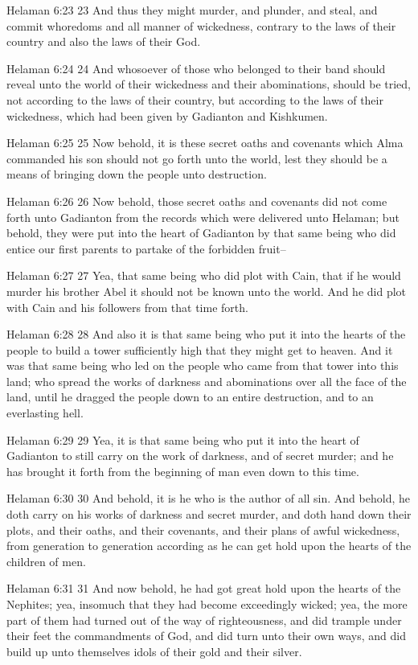 Helaman 6:23
 23 And thus they might murder, and plunder, and steal, and
commit whoredoms and all manner of wickedness, contrary to the
laws of their country and also the laws of their God.

Helaman 6:24
 24 And whosoever of those who belonged to their band should
reveal unto the world of their wickedness and their abominations,
should be tried, not according to the laws of their country, but
according to the laws of their wickedness, which had been given
by Gadianton and Kishkumen.

Helaman 6:25
 25 Now behold, it is these secret oaths and covenants which Alma
commanded his son should not go forth unto the world, lest they
should be a means of bringing down the people unto destruction.

Helaman 6:26
 26 Now behold, those secret oaths and covenants did not come
forth unto Gadianton from the records which were delivered unto
Helaman; but behold, they were put into the heart of Gadianton by
that same being who did entice our first parents to partake of
the forbidden fruit--

Helaman 6:27
 27 Yea, that same being who did plot with Cain, that if he would
murder his brother Abel it should not be known unto the world.
And he did plot with Cain and his followers from that time forth.

Helaman 6:28
 28 And also it is that same being who put it into the hearts of
the people to build a tower sufficiently high that they might get
to heaven. And it was that same being who led on the people who
came from that tower into this land; who spread the works of
darkness and abominations over all the face of the land, until he
dragged the people down to an entire destruction, and to an
everlasting hell.

Helaman 6:29
 29 Yea, it is that same being who put it into the heart of
Gadianton to still carry on the work of darkness, and of secret
murder; and he has brought it forth from the beginning of man
even down to this time.

Helaman 6:30
 30 And behold, it is he who is the author of all sin. And
behold, he doth carry on his works of darkness and secret murder,
and doth hand down their plots, and their oaths, and their
covenants, and their plans of awful wickedness, from generation
to generation according as he can get hold upon the hearts of the
children of men.

Helaman 6:31
 31 And now behold, he had got great hold upon the hearts of the
Nephites; yea, insomuch that they had become exceedingly wicked;
yea, the more part of them had turned out of the way of
righteousness, and did trample under their feet the commandments
of God, and did turn unto their own ways, and did build up unto
themselves idols of their gold and their silver.

